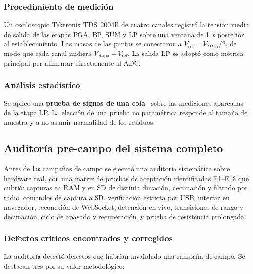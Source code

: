 \subsubsection{Procedimiento de medici\'on}

Un osciloscopio Tektronix TDS~2004B de cuatro canales registr\'o la tensi\'on media de
salida de las etapas PGA, BP, SUM y LP sobre una ventana de \SI{1}{\second} posterior al
establecimiento. Las masas de las puntas se conectaron a $V_{\mathrm{ref}}=V_{DDA}/2$,
de modo que cada canal midiera $V_{\mathrm{etapa}}-V_{\mathrm{ref}}$. La salida LP se
adopt\'o como m\'etrica principal por alimentar directamente al ADC.

\subsubsection{An\'alisis estad\'istico}

Se aplic\'o una \textbf{prueba de signos de una cola}~\cite{Conover1999} sobre las
mediciones apareadas de la etapa LP. La elecci\'on de una prueba no param\'etrica responde
al tama\~no de muestra y a no asumir normalidad de los residuos.

\subsection{Auditor\'ia pre-campo del sistema completo}
\label{sec:auditoria}

Antes de las campa\~nas de campo se ejecut\'o una auditor\'ia sistem\'atica sobre hardware
real, con una matriz de pruebas de aceptaci\'on identificadas E1--E18 que cubri\'o: capturas
en RAM y en SD de distinta duraci\'on, decimaci\'on y filtrado por radio, comandos de
captura a SD, verificaci\'on estricta por USB, interfaz en navegador, reconexi\'on de
WebSocket, detenci\'on en vivo, transiciones de rango y decimaci\'on, ciclo de apagado y
recuperaci\'on, y prueba de resistencia prolongada.

\subsubsection{Defectos cr\'iticos encontrados y corregidos}

La auditor\'ia detect\'o defectos que habr\'ian invalidado una campa\~na de campo. Se destacan
tres por su valor metodol\'ogico:

